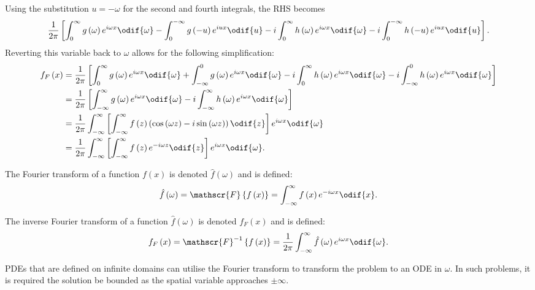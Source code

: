 \documentclass{article}
\begin{document}
Using the substitution \(u = -\omega\) for the second and fourth
integrals, the RHS becomes
\begin{equation*}
    \frac{1}{2 \pi} \left[ \int_0^\infty g\left( \omega \right) e^{i \omega x} \odif{\omega} - \int_0^{-\infty} g\left( -u \right) e^{i u x} \odif{u} - i \int_0^\infty h\left( \omega \right) e^{i \omega x} \odif{\omega} - i \int_0^{-\infty} h\left( -u \right) e^{i u x} \odif{u} \right].
\end{equation*}
Reverting this variable back to \(\omega\) allows for the following
simplification:
\begin{align*}
    f_F\left( x \right) & = \frac{1}{2 \pi} \left[ \int_0^\infty g\left( \omega \right) e^{i \omega x} \odif{\omega} + \int_{-\infty}^0 g\left( \omega \right) e^{i \omega x} \odif{\omega} - i \int_0^\infty h\left( \omega \right) e^{i \omega x} \odif{\omega} - i \int_{-\infty}^0 h\left( \omega \right) e^{i \omega x} \odif{\omega} \right] \\
                        & = \frac{1}{2 \pi} \left[ \int_{-\infty}^\infty g\left( \omega \right) e^{i \omega x} \odif{\omega} - i \int_{-\infty}^\infty h\left( \omega \right) e^{i \omega x} \odif{\omega} \right]                                                                                                                                 \\
                        & = \frac{1}{2 \pi} \int_{-\infty}^\infty \left[ \int_{-\infty}^\infty f\left( z \right) \left( \cos{\left( \omega z \right)} - i \sin{\left( \omega z \right)} \right) \odif{z} \right] e^{i \omega x} \odif{\omega}                                                                                                      \\
                        & = \frac{1}{2 \pi} \int_{-\infty}^\infty \left[ \int_{-\infty}^\infty f\left( z \right) e^{-i \omega z} \odif{z} \right] e^{i \omega x} \odif{\omega}.
\end{align*}
\begin{definition}
    The Fourier transform of a function \(f\left( x \right)\) is denoted
    \(\hat{f}\left( \omega \right)\) and is defined:
    \begin{equation*}
        \hat{f}\left( \omega \right) = \mathscr{F}\left\{ f\left( x \right) \right\} = \int_{-\infty}^\infty f\left( x \right) e^{-i \omega x} \odif{x}.
    \end{equation*}
\end{definition}
\begin{definition}
    The inverse Fourier transform of a function
    \(\hat{f}\left( \omega \right)\) is denoted
    \(f_F\left( x \right)\) and is defined:
    \begin{equation*}
        f_F\left( x \right) = \mathscr{F}^{-1}\left\{ f\left( x \right) \right\} = \frac{1}{2 \pi} \int_{-\infty}^\infty \hat{f}\left( \omega \right) e^{i \omega x} \odif{\omega}.
    \end{equation*}
\end{definition}
PDEs that are defined on infinite domains can utilise the Fourier
transform to transform the problem to an ODE in \(\omega\). In such
problems, it is required the solution be bounded as the spatial
variable approaches \(\pm \infty\).
\end{document}
